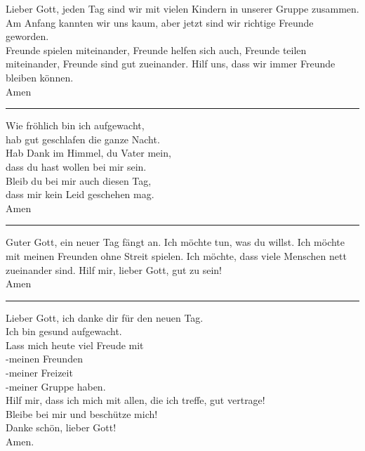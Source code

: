 \newpage


    

Lieber Gott, jeden Tag sind wir mit vielen Kindern in unserer Gruppe zusammen. Am Anfang kannten wir uns kaum, aber jetzt sind wir richtige Freunde geworden.\\
Freunde spielen miteinander, Freunde helfen sich auch, Freunde teilen miteinander, Freunde sind gut zueinander. Hilf uns, dass wir immer Freunde bleiben können.\\ \newline
Amen\\ 
\par\noindent\rule{\textwidth}{0.4pt}
\newline
\newline
Wie fröhlich bin ich aufgewacht,\\
hab gut geschlafen die ganze Nacht.\\
Hab Dank im Himmel, du Vater mein,\\
dass du hast wollen bei mir sein.\\
Bleib du bei mir auch diesen Tag,\\
dass mir kein Leid geschehen mag.\\ \newline
Amen\\

\par\noindent\rule{\textwidth}{0.4pt} \newline \newline
Guter Gott, ein neuer Tag fängt an.  Ich möchte tun, was du willst.  Ich möchte mit meinen Freunden ohne Streit spielen. Ich möchte, dass viele Menschen nett zueinander sind.  Hilf mir, lieber Gott, gut zu sein!\\ \newline
Amen\\
\par\noindent\rule{\textwidth}{0.4pt} \newline \newline
Lieber Gott, ich danke dir für den neuen Tag.\\
Ich bin gesund aufgewacht.\\
Lass mich heute viel Freude mit\\  
-meinen Freunden  \\
-meiner Freizeit\\
-meiner Gruppe haben.\\
Hilf mir, dass ich mich mit allen, die ich treffe, gut vertrage!\\
Bleibe bei mir und beschütze mich!\\
Danke schön, lieber Gott! \\ \newline
Amen.\\

